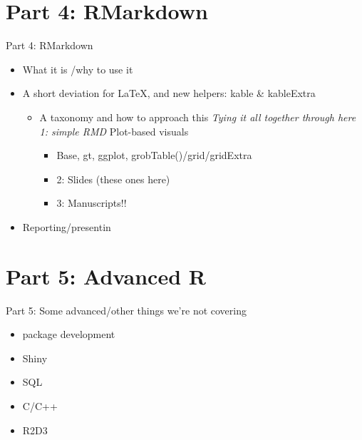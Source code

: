 \documentclass[ignorenonframetext,]{beamer}
\providecommand{\tightlist}{%
  \setlength{\itemsep}{0pt}\setlength{\parskip}{0pt}}
\begin{document}
\hypertarget{part-4-rmarkdown}{%
\section{Part 4: RMarkdown}\label{part-4-rmarkdown}}

\begin{frame}{Part 4: RMarkdown}
\protect\hypertarget{part-4-rmarkdown-1}{}

\begin{itemize}
\tightlist
\item
  What it is /why to use it
\item
  A short deviation for LaTeX, and new helpers: kable \& kableExtra

  \begin{itemize}
  \tightlist
  \item
    A taxonomy and how to approach this \emph{Tying it all together
    through here 1: simple RMD }Plot-based visuals

    \begin{itemize}
    \tightlist
    \item
      Base, gt, ggplot, grobTable()/grid/gridExtra
    \item
      2: Slides (these ones here)
    \item
      3: Manuscripts!!
    \end{itemize}
  \end{itemize}
\item
  Reporting/presentin
\end{itemize}

\end{frame}

\hypertarget{part-5-advanced-r}{%
\section{Part 5: Advanced R}\label{part-5-advanced-r}}

\begin{frame}{Part 5: Some advanced/other things we're not covering}
\protect\hypertarget{part-5-some-advancedother-things-were-not-covering}{}

\begin{itemize}
\tightlist
\item
  package development
\item
  Shiny
\item
  SQL
\item
  C/C++
\item
  R2D3
\end{itemize}

\end{frame}
\end{document}
